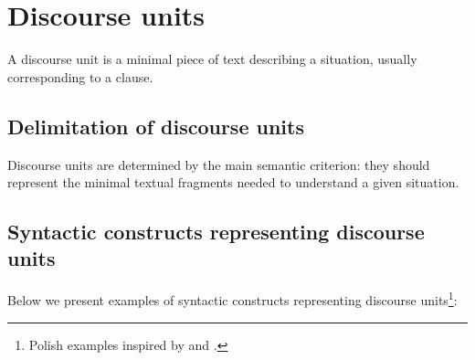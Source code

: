 \documentclass{udisc}
\begin{document}
\section{Discourse units}
\label{discourse-units}

A discourse unit is a minimal piece of text describing a situation, usually corresponding to a clause.


\subsection{Delimitation of discourse units}

Discourse units are determined by the main semantic criterion: they should represent the minimal textual fragments needed to understand a given situation.






\subsection{Syntactic constructs representing discourse units}

Below we present examples of syntactic constructs representing discourse units\footnote{Polish examples inspired by \citep[][p.~31--33]{jodlowski1976} and \citep{marcinczuk2016}.}:
\end{document}
